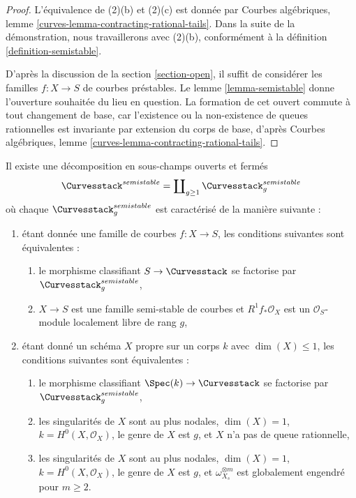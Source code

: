\begin{proof}
L'équivalence de (2)(b) et (2)(c) est donnée par
Courbes algébriques, lemme \ref{curves-lemma-contracting-rational-tails}.
Dans la suite de la démonstration, nous travaillerons avec (2)(b),
conformément à la définition \ref{definition-semistable}.

\medskip\noindent
D'après la discussion de la section \ref{section-open},
il suffit de considérer les familles $f : X \to S$ de
courbes préstables. Le lemme \ref{lemma-semistable}
donne l'ouverture souhaitée du lieu en question.
La formation de cet ouvert commute à tout changement de base,
car l'existence ou la non-existence de queues rationnelles est invariante
par extension du corps de base, d'après
Courbes algébriques, lemme \ref{curves-lemma-contracting-rational-tails}.
\end{proof}

\begin{lemma}
\label{lemma-semistable-one-piece-per-genus}
Il existe une décomposition en sous-champs ouverts et fermés
$$
\Curvesstack^{semistable} = \coprod\nolimits_{g \geq 1}
\Curvesstack^{semistable}_g
$$
où chaque $\Curvesstack^{semistable}_g$ est caractérisé de la manière suivante :
\begin{enumerate}
\item étant donnée une famille de courbes $f : X \to S$, les conditions suivantes sont équivalentes :
\begin{enumerate}
\item le morphisme classifiant $S \to \Curvesstack$ se factorise
par $\Curvesstack^{semistable}_g$,
\item $X \to S$ est une famille semi-stable de courbes et
$R^1f_*\mathcal{O}_X$ est un $\mathcal{O}_S$-module localement libre de rang $g$,
\end{enumerate}
\item étant donné un schéma $X$ propre sur un corps $k$ avec
$\dim(X) \leq 1$, les conditions suivantes sont équivalentes :
\begin{enumerate}
\item le morphisme classifiant $\Spec(k) \to \Curvesstack$
se factorise par $\Curvesstack^{semistable}_g$,
\item les singularités de $X$ sont au plus nodales, $\dim(X) = 1$,
$k = H^0(X, \mathcal{O}_X)$, le genre de $X$ est $g$, et $X$
n'a pas de queue rationnelle,
\item les singularités de $X$ sont au plus nodales, $\dim(X) = 1$,
$k = H^0(X, \mathcal{O}_X)$, le genre de $X$ est $g$, et
$\omega_{X_s}^{\otimes m}$ est globalement engendré pour $m \geq 2$.
\end{enumerate}
\end{enumerate}
\end{lemma}

